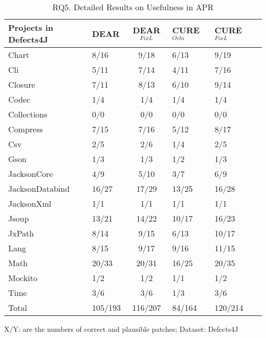 \begin{table}[t]
	\caption{RQ5. Detailed Results on Usefulness in APR}
	\vspace{-10pt}
	\begin{center}
        \footnotesize
		\renewcommand{\arraystretch}{1} 
		\begin{tabular}{l|p{0.8cm}<{\centering}c|p{0.8cm}<{\centering}p{0.8cm}<{\centering}p{0.8cm}<{\centering}}
			
		    \hline
		    Projects in Defects4J 	    & DEAR  & DEAR$^{FixL}$ & CURE$^{Ochi}$  & CURE$^{FixL}$  \\
		    \hline
		    Chart       	& 8/16  &  9/18      & 6/13     & 9/19         \\
		    Cli        	    & 5/11  &  7/14 	 & 4/11  	  & 7/16         \\
		    Closure     	& 7/11  &  8/13  	 & 6/10   	  & 9/14         \\
		    Codec       	& 1/4   &  1/4  	 & 1/4    	  & 1/4          \\
		    Collections 	& 0/0   &  0/0       & 0/0     	  & 0/0          \\
		    Compress   		& 7/15  &  7/16      & 5/12   	  & 8/17         \\
		    Csv         	& 2/5   &  2/6       & 1/4    	  & 2/5          \\
		    Gson            & 1/3   &  1/3       & 1/2    	  & 1/3          \\
		    JacksonCore     & 4/9   &  5/10      & 3/7     	  & 6/9          \\
		    JacksonDatabind & 16/27 &  17/29     & 13/25  	  & 16/28        \\
		    JacksonXml      & 1/1   &  1/1       & 1/1     	  & 1/1          \\
		    Jsoup           & 13/21 &  14/22     & 10/17  	  & 16/23        \\
		    JxPath          & 8/14  &  9/15      & 6/13   	  & 10/17        \\
		    Lang            & 8/15  &  9/17      & 9/16  	  & 11/15        \\
		    Math            & 20/33 &  20/31     & 16/25  	  & 20/35        \\
		    Mockito         & 1/2   &  1/2       & 1/1    	  & 1/2          \\
		    Time            & 3/6   &  3/6       & 1/3    	  & 3/6          \\
			\hline
			Total           & 105/193  &  116/207  & 84/164       & 120/214         \\
			\hline
		\end{tabular}

{\footnotesize X/Y: are the numbers of correct and plausible patches; Dataset: Defects4J}
		\label{RQ5_2}
	\end{center}
\vspace{-5pt}
\end{table}

